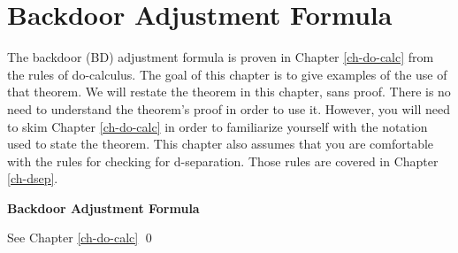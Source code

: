 \chapter{Backdoor Adjustment Formula}
\label{ch-bdoor}

The backdoor (BD) adjustment
formula is proven in
Chapter \ref{ch-do-calc}
from the rules of do-calculus.
The goal 
of this chapter is
to give examples
of the use of that
theorem.
We will restate
the theorem in this chapter,
sans proof.
There is no need
to understand the
theorem's
proof in order to use it.
However, you
will
need to skim Chapter \ref{ch-do-calc}
in order to familiarize 
yourself with
the notation used to state the 
theorem.
This chapter also assumes
that you are comfortable 
with the  rules 
for checking for d-separation. Those rules
are covered in Chapter \ref{ch-dsep}.



\bdoordef
\begin{claim} {\bf Backdoor Adjustment
 Formula}

\bdoorclaim
\end{claim}
\proof 
See Chapter \ref{ch-do-calc}
\qed

